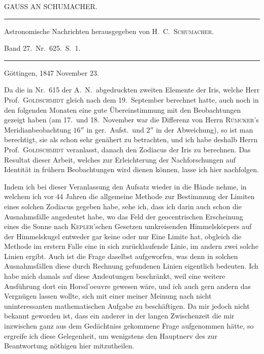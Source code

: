 \clearpage{}%
\begin{center}
{\small GAUSS AN SCHUMACHER.\par}
\medskip\hrule\medskip
{\small Astronomische Nachrichten herausgegeben von H.\ C.\ \textsc{Schumacher}.\par
Band 27.\ Nr.\ 625.\ S.\ 1.\par}
\medskip\hrule
\end{center}\medskip
\begin{flushright}Göttingen, 1847 November 23.\end{flushright}
Da die in Nr.\ 615 der A.\ N.\ abgedruckten zweiten Elemente der Iris, welche Herr Prof.\ \textsc{Goldschmidt} gleich nach dem 19.\ September berechnet hatte, auch noch in den folgenden Monaten eine gute Übereinstimmung mit den Beobachtungen gezeigt haben (am 17.\ und 18.\ November war die Differenz von Herrn \textsc{Rümcker}'s Meridianbeobachtung $16''$ in ger.\ Aufst.\ und $2''$ in der Abweichung), so ist man berechtigt, sie als schon sehr genähert zu betrachten, und ich habe deshalb Herrn Prof.\ \textsc{Goldschmidt} veranlasst, danach den Zodiacus der Iris zu berechnen. Das Resultat dieser Arbeit, welches zur Erleichterung der Nachforschungen auf Identität in frühern Beobachtungen wird dienen können, lasse ich hier nachfolgen.

Indem ich bei dieser Veranlassung den Aufsatz wieder in die Hände nehme, in welchem ich vor 44 Jahren die allgemeine Methode zur Bestimmung der Limiten eines solchen Zodiacus gegeben habe, sehe ich, dass ich darin auch schon die Ausnahmsfälle angedeutet habe, wo das Feld der geocentrischen Erscheinung eines die Sonne nach \textsc{Kepler}'schen Gesetzen umkreisenden Himmelskörpers auf der Himmelskugel entweder gar keine oder nur Eine Limite hat, obgleich die Methode im erstern Falle eine in sich zurücklaufende Linie, im andern zwei solche Linien ergibt. Auch ist die Frage daselbst aufgeworfen, was denn in solchen Ausnahmsfällen diese durch Rechnung gefundenen Linien eigentlich
%
bedeuten. Ich habe mich damals auf diese Andeutungen beschränkt, weil eine weitere Ausführung dort ein Horsd'oeuvre gewesen wäre, und ich auch gern andern das Vergnügen lassen wollte, sich mit einer meiner Meinung nach nicht uninteressanten mathematischen Aufgabe zu beschäftigen. Da mir jedoch nicht bekannt geworden ist, dass ein anderer in der langen Zwischenzeit die mir inzwischen ganz aus dem Gedächtniss gekommene Frage aufgenommen hätte, so ergreife ich diese Gelegenheit, um wenigstens den Hauptnerv des zur Beantwortung nöthigen hier mitzutheilen.

